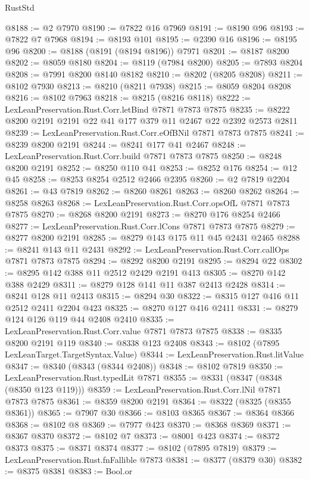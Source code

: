\begin{lexlean}{RustStd}
\begin{coremodule}
{\begin{coremodule}
{{{{{{{{{{{{{{{{{{{{{{{{{{{{{{{{{{{{{{{{{{{{{{{{{{@8188 := @2 @7970
@8190 := @7822 @16 @7969
@8191 := @8190 @96
@8193 := @7822 @7 @7968
@8194 := @8193 @101
@8195 := @2390 @16
@8196 := @8195 @96
@8200 := @8188 (@8191 (@8194 @8196)) @7971
@8201 := @8187 @8200
@8202 := @8059 @8180
@8204 := @8119 (@7984 @8200)
@8205 := @7893 @8204
@8208 := @7991 @8200 @8140 @8182
@8210 := @8202 (@8205 @8208)
@8211 := @8102 @7930
@8213 := @8210 (@8211 @7938)
@8215 := @8059 @8204 @8208
@8216 := @8102 @7963
@8218 := @8215 (@8216 @8118)
@8222 := LexLeanPreservation.Rust.Corr.letBind @7871 @7873 @7875
@8235 := @8222 @8200 @2191 @2191 @22 @41 @177 @379 @11 @2467 @22 @2392 @2573 @2811
@8239 := LexLeanPreservation.Rust.Corr.eOfBNil @7871 @7873 @7875
@8241 := @8239 @8200 @2191
@8244 := @8241 @177 @41 @2467
@8248 := LexLeanPreservation.Rust.Corr.build @7871 @7873 @7875
@8250 := @8248 @8200 @2191
@8252 := @8250 @110 @41
@8253 := @8252 @176
@8254 := @12 @45
@8258 := @8253 @8254 @2512 @2466 @2395
@8260 := @2 @7819 @2204
@8261 := @43 @7819
@8262 := @8260 @8261
@8263 := @8260 @8262
@8264 := @8258 @8263
@8268 := LexLeanPreservation.Rust.Corr.opsOfL @7871 @7873 @7875
@8270 := @8268 @8200 @2191
@8273 := @8270 @176 @8254 @2466
@8277 := LexLeanPreservation.Rust.Corr.lCons @7871 @7873 @7875
@8279 := @8277 @8200 @2191
@8285 := @8279 @143 @175 @11 @45 @2431 @2465
@8288 := @8241 @143 @11 @2431
@8292 := LexLeanPreservation.Rust.Corr.callOps @7871 @7873 @7875
@8294 := @8292 @8200 @2191
@8295 := @8294 @22
@8302 := @8295 @142 @388 @11 @2512 @2429 @2191 @413
@8305 := @8270 @142 @388 @2429
@8311 := @8279 @128 @141 @11 @387 @2413 @2428
@8314 := @8241 @128 @11 @2413
@8315 := @8294 @30
@8322 := @8315 @127 @416 @11 @2512 @2411 @2204 @423
@8325 := @8270 @127 @416 @2411
@8331 := @8279 @124 @126 @119 @44 @2408 @2410
@8335 := LexLeanPreservation.Rust.Corr.value @7871 @7873 @7875
@8338 := @8335 @8200 @2191 @119
@8340 := @8338 @123 @2408
@8343 := @8102 (@7895 LexLeanTarget.TargetSyntax.Value)
@8344 := LexLeanPreservation.Rust.litValue
@8347 := @8340 (@8343 (@8344 @2408))
@8348 := @8102 @7819
@8350 := LexLeanPreservation.Rust.typedLit @7871
@8355 := @8331 (@8347 (@8348 (@8350 @123 @119)))
@8359 := LexLeanPreservation.Rust.Corr.lNil @7871 @7873 @7875
@8361 := @8359 @8200 @2191
@8364 := @8322 (@8325 (@8355 @8361))
@8365 := @7907 @30
@8366 := @8103 @8365
@8367 := @8364 @8366
@8368 := @8102 @8
@8369 := @7977 @423
@8370 := @8368 @8369
@8371 := @8367 @8370
@8372 := @8102 @7
@8373 := @8001 @423
@8374 := @8372 @8373
@8375 := @8371 @8374
@8377 := @8102 (@7895 @7819)
@8379 := LexLeanPreservation.Rust.fnFallible @7873
@8381 := @8377 (@8379 @30)
@8382 := @8375 @8381
@8383 := Bool.or
}}}}}}}}}}}}}}}}}}}}}}}}}}}}}}}}}}}}}}}}}}}}}}}}}}
\end{coremodule}}
\end{coremodule}
\end{lexlean}
